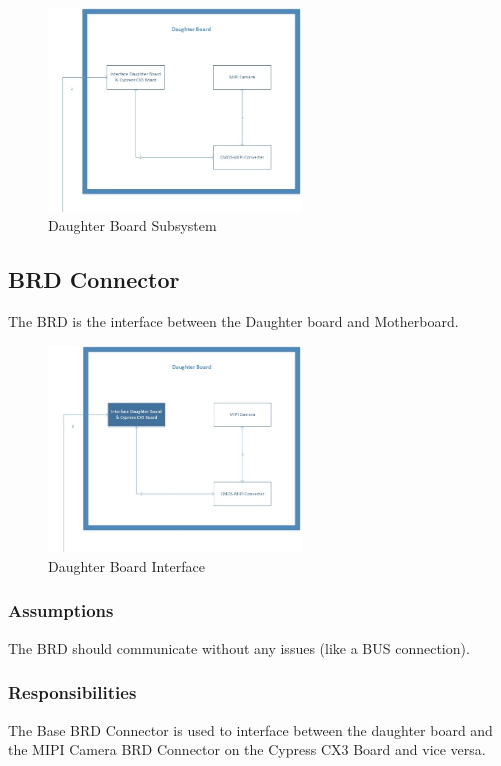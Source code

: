 
\begin{figure}[h!]
	\centering
 	\includegraphics[width=0.60\textwidth]{images/DaughterBoard.jpg}
 \caption{Daughter Board Subsystem}
\end{figure}

\subsection{BRD Connector}
The BRD is the interface between the Daughter board and Motherboard.

\begin{figure}[h!]
	\centering
 	\includegraphics[width=0.60\textwidth]{images/DaughterBoard_Interface.jpg}
 \caption{Daughter Board Interface}
\end{figure}

\subsubsection{Assumptions}
The BRD should communicate without any issues (like a BUS connection).

\subsubsection{Responsibilities}
The Base BRD Connector is used to interface between the daughter board and the MIPI Camera BRD Connector on the Cypress CX3 Board and vice versa.

